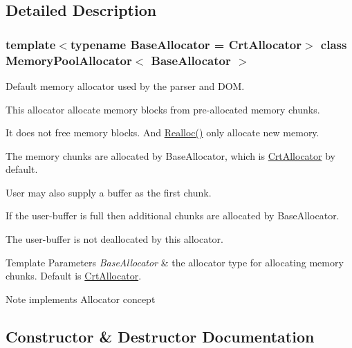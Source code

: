 \subsection{Detailed Description}
\subsubsection*{template$<$typename Base\+Allocator = Crt\+Allocator$>$\newline
class Memory\+Pool\+Allocator$<$ Base\+Allocator $>$}

Default memory allocator used by the parser and D\+OM. 

This allocator allocate memory blocks from pre-\/allocated memory chunks.

It does not free memory blocks. And \hyperlink{classMemoryPoolAllocator_aba75280d42184b0ad414243f7f5ac6c7}{Realloc()} only allocate new memory.

The memory chunks are allocated by Base\+Allocator, which is \hyperlink{classCrtAllocator}{Crt\+Allocator} by default.

User may also supply a buffer as the first chunk.

If the user-\/buffer is full then additional chunks are allocated by Base\+Allocator.

The user-\/buffer is not deallocated by this allocator.


\begin{DoxyTemplParams}{Template Parameters}
{\em Base\+Allocator} & the allocator type for allocating memory chunks. Default is \hyperlink{classCrtAllocator}{Crt\+Allocator}. \\
\hline
\end{DoxyTemplParams}
\begin{DoxyNote}{Note}
implements Allocator concept 
\end{DoxyNote}


\subsection{Constructor \& Destructor Documentation}
\mbox{\label{classMemoryPoolAllocator_aeec85ac657f242ac5620115141be5209}} 
